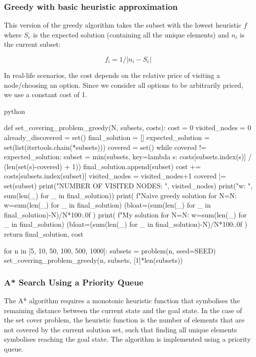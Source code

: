 \subsubsection{Greedy with basic heuristic approximation}

This version of the greedy algorithm takes the subset with the lowest heuristic $f$ where $S_e$ is the expected solution (containing all the unique elements) and $n_i$ is the current subset:

\begin{equation*}
  f_i = 1 / |n_i - S_e|
\end{equation*}

In real-life scenarios, the cost depends on the relative price of visiting a node/choosing an option. Since we consider all options to be arbitrarily priced, we use a constant cost of 1.

\begin{mintedbox}{python}

def set_covering_problem_greedy(N, subsets, costs):
  cost = 0
  visited_nodes = 0
  already_discovered = set()
  final_solution = []
  expected_solution = set(list(itertools.chain(*subsets)))
  covered = set()
  while covered != expected_solution:
      subset = min(subsets, key=lambda s: costs[subsets.index(s)] / (len(set(s)-covered) + 1))
      final_solution.append(subset)
      cost += costs[subsets.index(subset)]
      visited_nodes = visited_nodes+1
      covered |= set(subset)
  print("NUMBER OF VISITED NODES: ", visited_nodes)
  print("w: ", sum(len(_) for _ in final_solution))
  print(
      f"Naive greedy solution for N={N}: w={sum(len(_) for _ in final_solution)} (bloat={(sum(len(_) for _ in final_solution)-N)/N*100:.0f}%
  )
  print(
      f"My solution for N={N}: w={sum(len(_) for _ in final_solution)} (bloat={(sum(len(_) for _ in final_solution)-N)/N*100:.0f}%
  )
  return final_solution, cost

  for n in [5, 10, 50, 100, 500, 1000]:
    subsets = problem(n, seed=SEED)
    set_covering_problem_greedy(n, subsets, [1]*len(subsets))
\end{mintedbox}

\subsubsection{A* Search Using a Priority Queue}

The A* algorithm requires a monotonic heuristic function that symbolises the remaining distance between the current state and the goal state. In the case of the set cover problem, the heuristic function is the number of elements that are not covered by the current solution set, such that finding all unique elements symbolises reaching the goal state. The algorithm is implemented using a priority queue.

